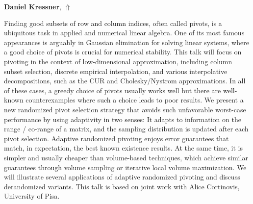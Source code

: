 \documentclass[ILAS2025-program.tex]{subfiles}
\begin{document}
\hypertarget{down0004}{}\begin{ilasabstract}
    
\textbf{Daniel Kressner},  \hfill \hyperlink{up0004}{$\Uparrow$}
    
    
\mtskip
    Finding good subsets of row and column indices, often called pivots, is a ubiquitous task in applied and numerical linear algebra. One of its most famous appearances is arguably in Gaussian elimination for solving linear systems, where a good choice of pivots is crucial for numerical stability. This talk will focus on pivoting in the context of low-dimensional approximation, including column subset selection, discrete empirical interpolation, and various interpolative decompositions, such as the CUR and Cholesky/Nystrom approximations. In all of these cases, a greedy choice of pivots usually works well but there are well-known counterexamples where such a choice leads to poor results. We present a new randomized pivot selection strategy that avoids such unfavorable worst-case performance by using adaptivity in two senses: It adapts to information on the range / co-range of a matrix, and the sampling distribution is updated after each pivot selection. Adaptive randomized pivoting enjoys error guarantees that match, in expectation, the best known existence results. At the same time, it is   simpler and usually cheaper than volume-based techniques, which achieve similar guarantees through volume sampling or iterative local volume maximization. We will illustrate several applications of adaptive randomized pivoting and discuss derandomized variants. This talk is based on joint work with Alice Cortinovis, University of Pisa.
\end{ilasabstract}
    
\end{document}
